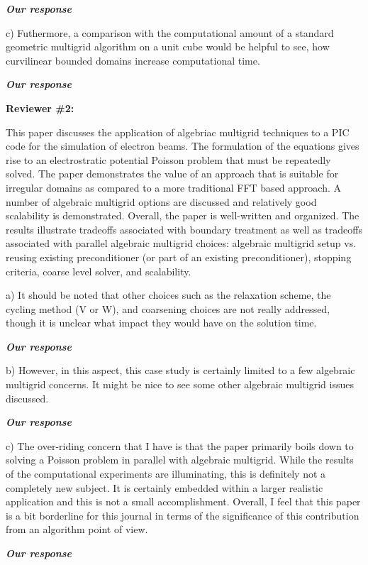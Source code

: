 \documentclass[10pt]{report}
\begin{document}
{\it {\bf Our response}}

c) Futhermore, a comparison with the computational amount of a standard
geometric multigrid algorithm on a unit cube would be helpful to see, how
curvilinear bounded domains increase computational time.

{\it {\bf Our response}}



\pagebreak

{\bf Reviewer \#2: }

This paper discusses the application of algebriac multigrid techniques to a PIC
code for the simulation of electron beams. The formulation of the equations
gives rise to an electrostratic potential  Poisson problem that must be
repeatedly solved. The paper demonstrates the value of an approach that is
suitable for irregular domains as compared to a more traditional FFT based
approach. A number of algebraic multigrid options are discussed and relatively
good scalability is demonstrated.  Overall, the paper is well-written and
organized. The results illustrate tradeoffs associated with boundary treatment
as well as tradeoffs associated with parallel algebraic multigrid choices:
algebraic multigrid setup vs. reusing existing preconditioner (or part of an
existing preconditioner), stopping criteria, coarse level solver, and
scalability.  

a) It should be noted that other choices such as the relaxation scheme, the
cycling method (V or W), and coarsening choices are not really addressed, though
it is unclear what impact they would have on the solution time. 

{\it {\bf Our response}}

b) However, in this aspect, this case study is certainly limited to a few
algebraic multigrid concerns. It might be nice to see some other algebraic
multigrid issues discussed.

{\it {\bf Our response}}


c) The over-riding concern that I have is that the paper primarily boils down to
solving a Poisson problem in parallel with algebraic multigrid.  While the
results of the computational experiments are illuminating, this is definitely not
a completely new subject. It is certainly embedded within a larger realistic
application and this is not a small accomplishment.  Overall, I feel that this
paper is a bit borderline for this journal in terms of the significance of this
contribution from an algorithm point of view.  

{\it {\bf Our response}}
\end{document}
